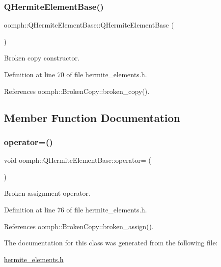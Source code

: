 \subsubsection{\texorpdfstring{Q\+Hermite\+Element\+Base()}{QHermiteElementBase()}\hspace{0.1cm}{\footnotesize\ttfamily [2/2]}}
{\footnotesize\ttfamily oomph\+::\+Q\+Hermite\+Element\+Base\+::\+Q\+Hermite\+Element\+Base (\begin{DoxyParamCaption}\item[{const \hyperlink{classoomph_1_1QHermiteElementBase}{Q\+Hermite\+Element\+Base} \&}]{ }\end{DoxyParamCaption})\hspace{0.3cm}{\ttfamily [inline]}}



Broken copy constructor. 



Definition at line 70 of file hermite\+\_\+elements.\+h.



References oomph\+::\+Broken\+Copy\+::broken\+\_\+copy().



\subsection{Member Function Documentation}
\mbox{\label{classoomph_1_1QHermiteElementBase_af741c8a7a04d2bb791d54d4cd01c8640}} 
\subsubsection{\texorpdfstring{operator=()}{operator=()}}
{\footnotesize\ttfamily void oomph\+::\+Q\+Hermite\+Element\+Base\+::operator= (\begin{DoxyParamCaption}\item[{const \hyperlink{classoomph_1_1QHermiteElementBase}{Q\+Hermite\+Element\+Base} \&}]{ }\end{DoxyParamCaption})\hspace{0.3cm}{\ttfamily [inline]}}



Broken assignment operator. 



Definition at line 76 of file hermite\+\_\+elements.\+h.



References oomph\+::\+Broken\+Copy\+::broken\+\_\+assign().



The documentation for this class was generated from the following file\+:\begin{DoxyCompactItemize}
\item 
\hyperlink{hermite__elements_8h}{hermite\+\_\+elements.\+h}\end{DoxyCompactItemize}
